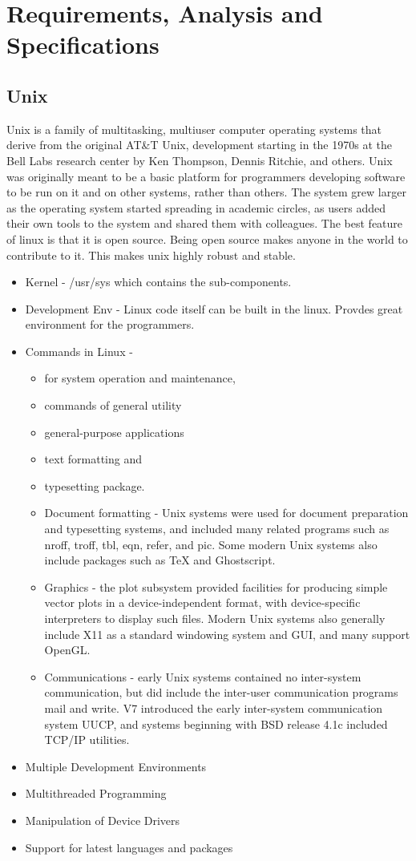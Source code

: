 \section{Requirements, Analysis and Specifications}
\subsection{Unix}
Unix is a family of multitasking, multiuser computer operating systems that derive from the original AT\&T Unix, development starting in the 1970s at the Bell Labs research center by Ken Thompson, Dennis Ritchie, and others.
Unix was originally meant to be a basic platform for programmers developing software to be run on it and on other systems, rather than others. The system grew larger as the operating system started spreading in academic circles, as users added their own tools to the system and shared them with colleagues. The best feature of linux is that it is open source. Being open source makes anyone in the world to contribute to it. This makes unix highly robust and stable.  
\begin{itemize}
	\item Kernel - /usr/sys which contains the sub-components.
	\item Development Env - Linux code itself can be built in the linux. Provdes great environment for the programmers.
	\item Commands in Linux - \begin{itemize}
	\item  for system operation and maintenance, \item commands of general utility\item general-purpose applications  \item text formatting and \item typesetting package. 
	\item Document formatting - Unix systems were used  for document preparation and typesetting systems, and included many related programs such as nroff, troff, tbl, eqn, refer, and pic. Some modern Unix systems also include packages such as TeX and Ghostscript.
	\item Graphics - the plot subsystem provided facilities for producing simple vector plots in a device-independent format, with device-specific interpreters to display such files. Modern Unix systems also generally include X11 as a standard windowing system and GUI, and many support OpenGL.
	\item Communications - early Unix systems contained no inter-system communication, but did include the inter-user communication programs mail and write. V7 introduced the early inter-system communication system UUCP, and systems beginning with BSD release 4.1c included TCP/IP utilities.
\end{itemize}
\item Multiple Development Environments
\item Multithreaded Programming
\item Manipulation of Device Drivers
\item Support for latest languages and packages
\end{itemize}
